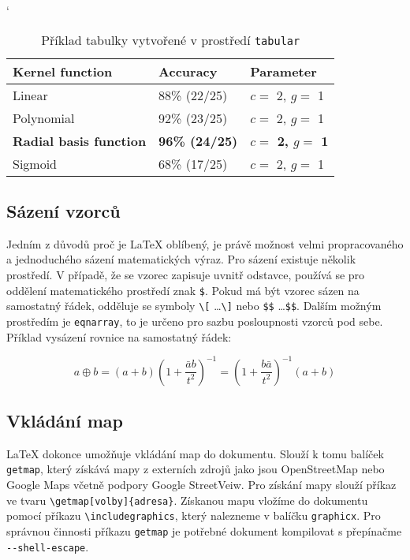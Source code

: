 \documentclass[11pt, a4paper]{article}
\begin{document}
\renewcommand{\arraystretch}{1.5}
\begin{table}[h!] \catcode`
\setlength\arrayrulewidth{1pt}
\small
\centering
    \begin{tabular}{|C{3.5cm}|C{2cm}|C{3.5cm}|}\hline
         Kernel function &
         Accuracy &
         Parameter \\ \hline
         Linear & 88\% (22/25) & $c =$ 2, $g =$ 1\\ \hline
         Polynomial & 92\% (23/25) & $c =$ 2, $g =$ 1\\ \hline
         \textbf{Radial basis function} & \textbf{96\% (24/25)} & \textbf{$c =$ 2, $g =$ 1}\\ \hline
         Sigmoid & 68\% (17/25) & $c =$ 2, $g =$ 1\\ \hline
    \end{tabular}
    \caption{Příklad tabulky vytvořené v prostředí \texttt{tabular} \cite{article:table}} 
\end{table}
\renewcommand{\arraystretch}{1}


\subsection{Sázení vzorců}
Jedním z důvodů proč je \LaTeX{} oblíbený, je právě možnost velmi propracovaného a jednoduchého sázení matematických výraz. Pro sázení existuje několik prostředí.\cite{book:rybicka}
V případě, že se vzorec zapisuje uvnitř odstavce, používá se pro oddělení matematického prostředí znak \verb|$|. Pokud má být vzorec sázen na samostatný řádek, odděluje se symboly \verb|\[| \dots \verb|\]| nebo \verb|$$| \dots \verb|$$|. Dalším možným prostředím je \verb|eqnarray|, to je určeno pro sazbu posloupnosti vzorců pod sebe.\cite{web:math} Příklad vysázení rovnice na samostatný řádek\cite{article:math}:

$$
a \oplus b = 
(a + b)\left(1+ \frac{\bar{a}b}{t^2}\right)^{-1} = 
\left(1+ \frac{b\bar{a}}{t^2}\right)^{-1} (a+b)
$$


\subsection{Vkládání map}
\LaTeX{} dokonce umožňuje vkládání map do dokumentu. Slouží k tomu balíček \verb|getmap|, který získává mapy z externích zdrojů jako jsou OpenStreetMap nebo Google Maps včetně podpory Google StreetVeiw. 
Pro získání mapy slouží příkaz ve tvaru \verb|\getmap[volby]{adresa}|. Získanou mapu vložíme do dokumentu pomocí příkazu \verb|\includegraphics|, který nalezneme v balíčku \verb|graphicx|. Pro správnou činnosti příkazu \verb|getmap| je potřebné dokument kompilovat s přepínačme \verb|--shell-escape|.\cite{article:map}
\end{document}
